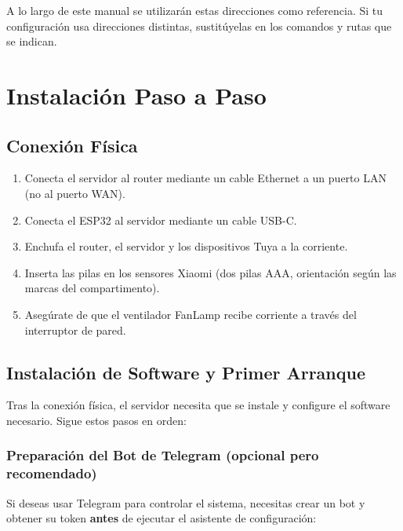 A lo largo de este manual se utilizarán estas direcciones como referencia. Si tu configuración usa direcciones distintas, sustitúyelas en los comandos y rutas que se indican.

\section{Instalación Paso a Paso}

\subsection{Conexión Física}

\begin{enumerate}
    \item Conecta el servidor al router mediante un cable Ethernet a un puerto LAN (no al puerto WAN).
    \item Conecta el ESP32 al servidor mediante un cable USB-C.
    \item Enchufa el router, el servidor y los dispositivos Tuya a la corriente.
    \item Inserta las pilas en los sensores Xiaomi (dos pilas AAA, orientación según las marcas del compartimento).
    \item Asegúrate de que el ventilador FanLamp recibe corriente a través del interruptor de pared.
\end{enumerate}

\subsection{Instalación de Software y Primer Arranque}
\label{sec:instalacion_software}

Tras la conexión física, el servidor necesita que se instale y configure el software necesario. Sigue estos pasos en orden:

\subsubsection*{Preparación del Bot de Telegram (opcional pero recomendado)}

Si deseas usar Telegram para controlar el sistema, necesitas crear un bot y obtener su token \textbf{antes} de ejecutar el asistente de configuración:

